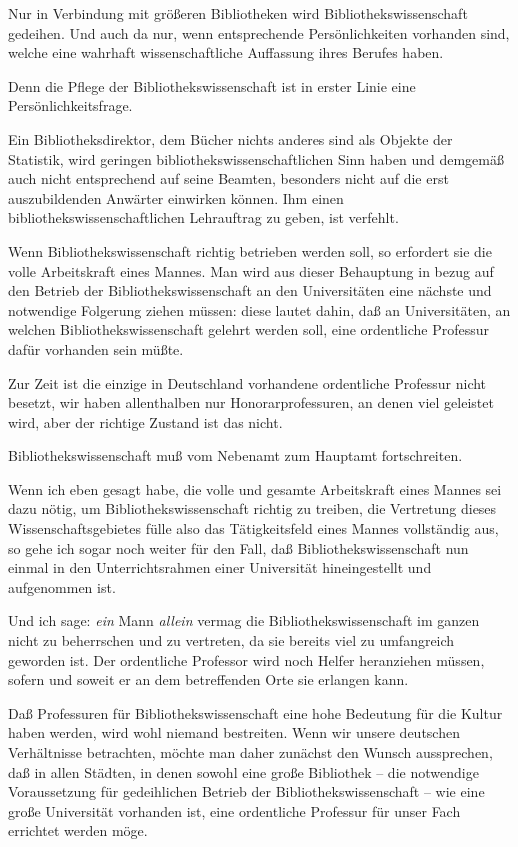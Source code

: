 \documentclass[a4paper,
fontsize=11pt,
oneside,
numbers=noperiodatend,
parskip=half-,
bibliography=totoc,
final
]{scrartcl}
\begin{document}
Nur in Verbindung mit größeren Bibliotheken wird Bibliothekswissenschaft
gedeihen. Und auch da nur, wenn entsprechende Persönlichkeiten vorhanden
sind, welche eine wahrhaft wissenschaftliche Auffassung ihres Berufes
haben.

Denn die Pflege der Bibliothekswissenschaft ist in erster Linie eine
Persönlichkeitsfrage.

Ein Bibliotheksdirektor, dem Bücher nichts anderes sind als Objekte der
Statistik, wird geringen bibliothekswissenschaftlichen Sinn haben und
demgemäß auch nicht entsprechend auf seine Beamten, besonders nicht auf
die erst auszubildenden Anwärter einwirken können. Ihm einen
bibliothekswissenschaftlichen Lehrauftrag zu geben, ist verfehlt.

Wenn Bibliothekswissenschaft richtig betrieben werden soll, so erfordert
sie die volle Arbeitskraft eines Mannes. Man wird aus dieser Behauptung
in bezug auf den Betrieb der Bibliothekswissenschaft an den
Universitäten eine nächste und notwendige Folgerung ziehen müssen: diese
lautet dahin, daß an Universitäten, an welchen Bibliothekswissenschaft
gelehrt werden soll, eine ordentliche Professur dafür vorhanden sein
müßte.

Zur Zeit ist die einzige in Deutschland vorhandene ordentliche Professur
nicht besetzt, wir haben allenthalben nur Honorarprofessuren, an denen
viel geleistet wird, aber der richtige Zustand ist das nicht.

Bibliothekswissenschaft muß vom Nebenamt zum Hauptamt fortschreiten.

Wenn ich eben gesagt habe, die volle und gesamte Arbeitskraft eines
Mannes sei dazu nötig, um Bibliothekswissenschaft richtig zu treiben,
die Vertretung dieses Wissenschaftsgebietes fülle also das
Tätigkeitsfeld eines Mannes vollständig aus, so gehe ich sogar noch
weiter für den Fall, daß Bibliothekswissenschaft nun einmal in den
Unterrichtsrahmen einer Universität hineingestellt und aufgenommen ist.

Und ich sage: \emph{ein} Mann \emph{allein} vermag die
Bibliothekswissenschaft im ganzen nicht zu beherrschen und zu vertreten,
da sie bereits viel zu umfangreich geworden ist. Der ordentliche
Professor wird noch Helfer heranziehen müssen, sofern und soweit er an
dem betreffenden Orte sie erlangen kann.

Daß Professuren für Bibliothekswissenschaft eine hohe Bedeutung für die
Kultur haben werden, wird wohl niemand bestreiten. Wenn wir unsere
deutschen Verhältnisse betrachten, möchte man daher zunächst den Wunsch
aussprechen, daß in allen Städten, in denen sowohl eine große Bibliothek
-- die notwendige Voraussetzung für gedeihlichen Betrieb der
Bibliothekswissenschaft -- wie eine große Universität vorhanden ist,
eine ordentliche Professur für unser Fach errichtet werden möge.
\end{document}
